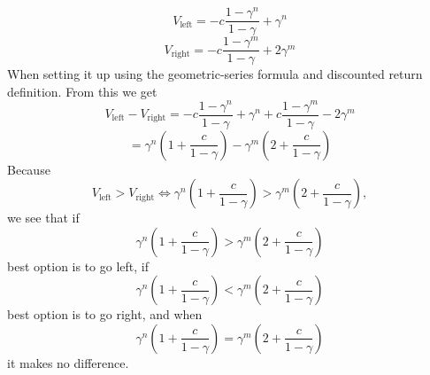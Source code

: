 \documentclass[12pt,twoside]{article}
\begin{document}
\[V_{\text{left}} = -c \frac{1-\gamma^n}{1-\gamma} + \gamma^n\]
\[V_{\text{right}} = -c \frac{1-\gamma^m}{1-\gamma} + 2\gamma^m\]
When setting it up using the geometric-series formula and discounted return definition. From this we get
\[
V_{\text{left}} - V_{\text{right}}
=
-c\frac{1-\gamma^n}{1-\gamma} + \gamma^n
+ c\frac{1-\gamma^m}{1-\gamma} - 2\gamma^m
\]
\[
= \gamma^n\left(1+\frac{c}{1-\gamma}\right)
- \gamma^m\left(2+\frac{c}{1-\gamma}\right)
\]
Because
\[
V_{\text{left}} > V_{\text{right}}
\Leftrightarrow
\gamma^n\left(1+\frac{c}{1-\gamma}\right)
>
\gamma^m\left(2+\frac{c}{1-\gamma}\right),
\]
we see that if
\[
\gamma^n\left(1+\frac{c}{1-\gamma}\right)
>
\gamma^m\left(2+\frac{c}{1-\gamma}\right)
\]
best option is to go left, if
\[
\gamma^n\left(1+\frac{c}{1-\gamma}\right)
<
\gamma^m\left(2+\frac{c}{1-\gamma}\right)
\]
best option is to go right, and when
\[
\gamma^n\left(1+\frac{c}{1-\gamma}\right)
=
\gamma^m\left(2+\frac{c}{1-\gamma}\right)
\]
it makes no difference.








\end{document}
